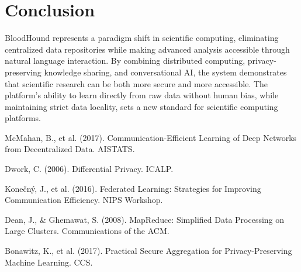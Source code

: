 \documentclass[11pt,a4paper]{article}
\begin{document}
\section{Conclusion}
BloodHound represents a paradigm shift in scientific computing, eliminating centralized data repositories while making advanced analysis accessible through natural language interaction. By combining distributed computing, privacy-preserving knowledge sharing, and conversational AI, the system demonstrates that scientific research can be both more secure and more accessible. The platform's ability to learn directly from raw data without human bias, while maintaining strict data locality, sets a new standard for scientific computing platforms.

\begin{thebibliography}{9}
 McMahan, B., et al. (2017). Communication-Efficient Learning of Deep Networks from Decentralized Data. AISTATS.

 Dwork, C. (2006). Differential Privacy. ICALP.

 Konečný, J., et al. (2016). Federated Learning: Strategies for Improving Communication Efficiency. NIPS Workshop.

 Dean, J., \& Ghemawat, S. (2008). MapReduce: Simplified Data Processing on Large Clusters. Communications of the ACM.

 Bonawitz, K., et al. (2017). Practical Secure Aggregation for Privacy-Preserving Machine Learning. CCS.
\end{thebibliography}
\end{document}
